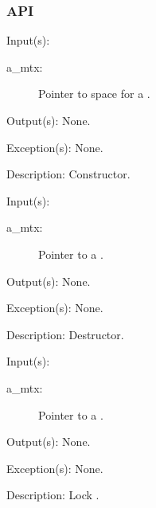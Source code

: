 \subsubsection{API}
\begin{capi}
\label{mtx_new}
	\begin{capilist}
	\item[Input(s): ]
		\begin{description}\item[]
		\item[a\_mtx: ]
			Pointer to space for a .
		\end{description}
	\item[Output(s): ] None.
	\item[Exception(s): ] None.
	\item[Description: ]
		Constructor.
	\end{capilist}
\label{mtx_delete}
	\begin{capilist}
	\item[Input(s): ]
		\begin{description}\item[]
		\item[a\_mtx: ]
			Pointer to a \classname{mtx}.
		\end{description}
	\item[Output(s): ] None.
	\item[Exception(s): ] None.
	\item[Description: ]
		Destructor.
	\end{capilist}
\label{mtx_lock}
	\begin{capilist}
	\item[Input(s): ]
		\begin{description}\item[]
		\item[a\_mtx: ]
			Pointer to a .
		\end{description}
	\item[Output(s): ] None.
	\item[Exception(s): ] None.
	\item[Description: ]
		Lock \cvar{a\_mtx}.
	\end{capilist}
\label{mtx_trylock}

\end{capi}
